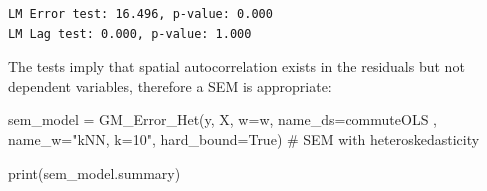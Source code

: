 \documentclass[
  number]{elsarticle}
\newenvironment{Shaded}{\begin{snugshade}}{\end{snugshade}}
\newcommand{\BuiltInTok}[1]{\textcolor[rgb]{0.00,0.23,0.31}{#1}}
\newcommand{\CommentTok}[1]{\textcolor[rgb]{0.37,0.37,0.37}{#1}}
\newcommand{\NormalTok}[1]{\textcolor[rgb]{0.00,0.23,0.31}{#1}}
\newcommand{\OperatorTok}[1]{\textcolor[rgb]{0.37,0.37,0.37}{#1}}
\newcommand{\StringTok}[1]{\textcolor[rgb]{0.13,0.47,0.30}{#1}}
\newcommand{\VariableTok}[1]{\textcolor[rgb]{0.07,0.07,0.07}{#1}}
\begin{document}
\begin{verbatim}
LM Error test: 16.496, p-value: 0.000
LM Lag test: 0.000, p-value: 1.000
\end{verbatim}

The tests imply that spatial autocorrelation exists in the residuals but
not dependent variables, therefore a SEM is appropriate:

\begin{Shaded}
\begin{Highlighting}[]
\NormalTok{sem\_model }\OperatorTok{=}\NormalTok{ GM\_Error\_Het(y, X, w}\OperatorTok{=}\NormalTok{w, name\_ds}\OperatorTok{=}\StringTok{\textquotesingle{}commuteOLS\textquotesingle{}}\NormalTok{ , name\_w}\OperatorTok{=}\StringTok{"kNN, k=10"}\NormalTok{, hard\_bound}\OperatorTok{=}\VariableTok{True}\NormalTok{) }\CommentTok{\# SEM with heteroskedasticity}

\BuiltInTok{print}\NormalTok{(sem\_model.summary)}
\end{Highlighting}
\end{Shaded}
\end{document}
